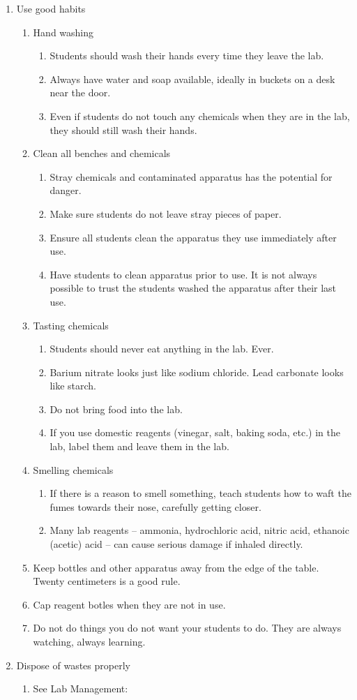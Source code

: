 \begin{enumerate}
\item{Use good habits}
\begin{enumerate}
\item{Hand washing}
\begin{enumerate}
\item{Students should wash their hands every time they leave the lab.}
\item{Always have water and soap available, 
ideally in buckets on a desk near the door.}
\item{Even if students do not touch any chemicals when they are in the lab, 
they should still wash their hands. }
\end{enumerate}
\item{Clean all benches and chemicals}
\begin{enumerate}
\item{Stray chemicals and contaminated apparatus has the potential for danger.}
\item{Make sure students do not leave stray pieces of paper.}
\item{Ensure all students clean the apparatus they use immediately after use.}
\item{Have students to clean apparatus prior to use. 
It is not always possible to trust the students washed the apparatus 
after their last use.}
\end{enumerate}
\item{Tasting chemicals}
\begin{enumerate}
\item{Students should never eat anything in the lab. Ever.}
\item{Barium nitrate looks just like sodium chloride. 
Lead carbonate looks like starch.}
\item{Do not bring food into the lab.}
\item{If you use domestic reagents 
(vinegar, salt, baking soda, etc.) in the lab, 
label them and leave them in the lab.}
\end{enumerate}
\item{Smelling chemicals}
\begin{enumerate}
\item{If there is a reason to smell something, 
teach students how to waft the fumes towards their nose, 
carefully getting closer.}
\item{Many lab reagents -- 
ammonia, hydrochloric acid, nitric acid, ethanoic (acetic) acid -- 
can cause serious damage if inhaled directly.}
\end{enumerate}
\item{Keep bottles and other apparatus away from the edge of the table. 
Twenty centimeters is a good rule.}
\item{Cap reagent botles when they are not in use.}
\item{Do not do things you do not want your students to do. 
They are always watching, always learning.}
\end{enumerate}

\item{Dispose of wastes properly}
\begin{enumerate}
\item{See Lab Management: }
\end{enumerate}
\end{enumerate}

